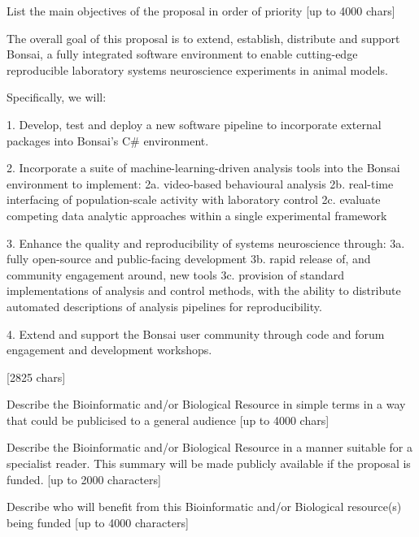 
List the main objectives of the proposal in order of priority [up to
  4000 chars]

The overall goal of this proposal is to extend, establish, distribute and support Bonsai, a fully integrated software
environment to enable cutting-edge reproducible laboratory systems neuroscience experiments in animal models.

Specifically, we will:

1. Develop, test and deploy a new software pipeline to incorporate external packages into Bonsai's C# environment.

2. Incorporate a suite of machine-learning-driven analysis tools into the Bonsai environment to implement:
2a. video-based  behavioural analysis
2b. real-time interfacing of population-scale activity with laboratory control  
2c. evaluate competing data analytic approaches within a single experimental framework

3. Enhance the quality and reproducibility of systems neuroscience through:
3a. fully open-source and public-facing development
3b. rapid release of, and community engagement around, new tools
3c. provision of standard implementations of analysis and control methods, with the ability to distribute automated
descriptions of analysis pipelines for reproducibility.

4. Extend and support the Bonsai user community through code and forum engagement and development workshops.

[2825 chars]





Describe the Bioinformatic and/or Biological Resource in simple terms in a way that could be publicised to a general audience [up to 4000 chars]

Describe the Bioinformatic and/or Biological Resource in a manner suitable for a specialist reader. This summary will be made publicly available if the proposal is funded. [up to 2000 characters]

Describe who will benefit from this Bioinformatic and/or Biological resource(s) being funded [up to 4000 characters]




